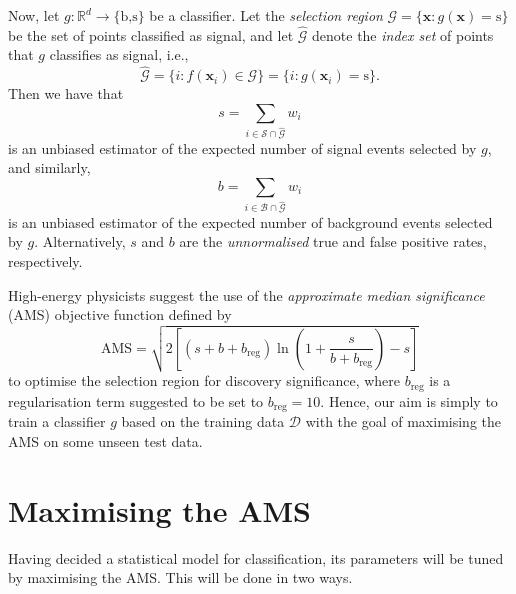 \documentclass[]{article}
\begin{document}
Now, let $g: \mathbb{R}^d \to \{\text{b,s}\}$ be a classifier. Let the \textit{selection region} $\mathcal{G} = \{\bm{x}: g(\bm{x}) = \text{s}\}$ be the set of points classified as signal, and let $\hat{\mathcal{G}}$ denote the \textit{index set} of points that $g$ classifies as signal, i.e.,
$$ \hat{\mathcal{G}} = \{i:f(\bm{x}_i) \in \mathcal{G}\} = \{i : g(\bm{x}_i) = \text{s}\}. $$
Then we have that
\begin{equation}
\label{s weights}
	s = \sum_{i \in \mathcal{S} \cap \hat{\mathcal{G}}} w_i
\end{equation}
is an unbiased estimator of the expected number of signal events selected by $g$, and similarly,
\begin{equation}
\label{b weights}
b = \sum_{i \in \mathcal{B} \cap \hat{\mathcal{G}}} w_i
\end{equation}
is an unbiased estimator of the expected number of background events selected by $g$. Alternatively, $s$ and $b$ are the \textit{unnormalised} true and false positive rates, respectively.

High-energy physicists suggest the use of the \textit{approximate median significance} (AMS) objective function defined by
\begin{equation}
\label{AMS}
	\text{AMS} = \sqrt{2 \left[ (s + b + b_\text{reg}) \ln \left( 1 + \frac{s}{b + b_\text{reg}} \right) - s \right]}
\end{equation}
to optimise the selection region for discovery significance, where $b_\text{reg}$ is a regularisation term suggested to be set to $b_\text{reg}=10$. Hence, our aim is simply to train a classifier $g$ based on the training data $\mathcal{D}$ with the goal of maximising the AMS on some unseen test data.

\section{Maximising the AMS}

Having decided a statistical model for classification, its parameters will be tuned by maximising the AMS. This will be done in two ways.
\end{document}
